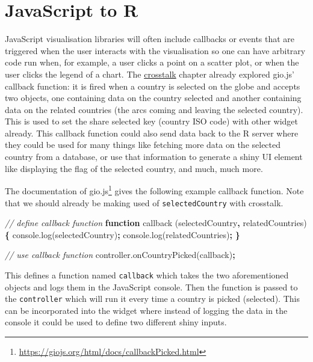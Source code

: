 \documentclass[
]{krantz}
\makeatletter
\newenvironment{Shaded}{\begin{snugshade}}{\end{snugshade}}
\newcommand{\AttributeTok}[1]{\textcolor[rgb]{0.61,0.61,0.61}{#1}}
\newcommand{\CommentTok}[1]{\textcolor[rgb]{0.37,0.37,0.37}{\textit{#1}}}
\newcommand{\KeywordTok}[1]{\textcolor[rgb]{0.27,0.27,0.27}{\textbf{#1}}}
\newcommand{\NormalTok}[1]{#1}
\newcommand{\OperatorTok}[1]{\textcolor[rgb]{0.43,0.43,0.43}{\textbf{#1}}}
\newcommand{\VariableTok}[1]{\textcolor[rgb]{0,0,0}{#1}}
\renewcommand{\href}[2]{#2\footnote{\url{#1}}}
\newenvironment{kframe}{%
\medskip{}
\setlength{\fboxsep}{.8em}
 \def\at@end@of@kframe{}%
 \ifinner\ifhmode%
  \def\at@end@of@kframe{\end{minipage}}%
  \begin{minipage}{\columnwidth}%
 \fi\fi%
 \def\FrameCommand##1{\hskip\@totalleftmargin \hskip-\fboxsep
 \colorbox{shadecolor}{##1}\hskip-\fboxsep
     \hskip-\linewidth \hskip-\@totalleftmargin \hskip\columnwidth}%
 \MakeFramed {\advance\hsize-\width
   \@totalleftmargin\z@ \linewidth\hsize
   \@setminipage}}%
 {\par\unskip\endMakeFramed%
 \at@end@of@kframe}
\renewenvironment{Shaded}{\begin{kframe}}{\end{kframe}}
\makeatother
\begin{document}
\hypertarget{javascript-to-r}{%
\section{JavaScript to R}\label{javascript-to-r}}

JavaScript visualisation libraries will often include callbacks or events that are triggered when the user interacts with the visualisation so one can have arbitrary code run when, for example, a user clicks a point on a scatter plot, or when the user clicks the legend of a chart. The \protect\hyperlink{crosstalk}{crosstalk} chapter already explored gio.js' callback function: it is fired when a country is selected on the globe and accepts two objects, one containing data on the country selected and another containing data on the related countries (the arcs coming and leaving the selected country). This is used to set the share selected key (country ISO code) with other widget already. This callback function could also send data back to the R server where they could be used for many things like fetching more data on the selected country from a database, or use that information to generate a shiny UI element like displaying the flag of the selected country, and much, much more.

The \href{https://giojs.org/html/docs/callbackPicked.html}{documentation of gio.js} gives the following example callback function. Note that we should already be making used of \texttt{selectedCountry} with crosstalk.

\begin{Shaded}
\begin{Highlighting}[]
\CommentTok{// define callback function}
\KeywordTok{function} \AttributeTok{callback}\NormalTok{ (selectedCountry}\OperatorTok{,}\NormalTok{ relatedCountries) }\OperatorTok{\{}
  \VariableTok{console}\NormalTok{.}\AttributeTok{log}\NormalTok{(selectedCountry)}\OperatorTok{;}
  \VariableTok{console}\NormalTok{.}\AttributeTok{log}\NormalTok{(relatedCountries)}\OperatorTok{;}
\OperatorTok{\}}

\CommentTok{// use callback function}
\VariableTok{controller}\NormalTok{.}\AttributeTok{onCountryPicked}\NormalTok{(callback)}\OperatorTok{;}
\end{Highlighting}
\end{Shaded}

This defines a function named \texttt{callback} which takes the two aforementioned objects and logs them in the JavaScript console. Then the function is passed to the \texttt{controller} which will run it every time a country is picked (selected). This can be incorporated into the widget where instead of logging the data in the console it could be used to define two different shiny inputs.
\end{document}
